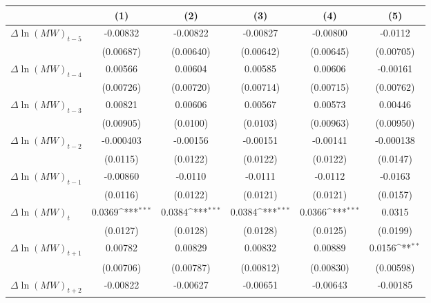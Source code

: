 {
\def\sym#1{\ifmmode^{#1}\else\(^{#1}\)\fi}
\begin{tabular}{l*{5}{c}}
\hline\hline
          &\multicolumn{1}{c}{(1)}         &\multicolumn{1}{c}{(2)}         &\multicolumn{1}{c}{(3)}         &\multicolumn{1}{c}{(4)}         &\multicolumn{1}{c}{(5)}         \\
\hline
$\Delta \ln(MW)_{t-5}$& -0.00832         & -0.00822         & -0.00827         & -0.00800         &  -0.0112         \\
          &(0.00687)         &(0.00640)         &(0.00642)         &(0.00645)         &(0.00705)         \\
[1em]
$\Delta \ln(MW)_{t-4}$&  0.00566         &  0.00604         &  0.00585         &  0.00606         & -0.00161         \\
          &(0.00726)         &(0.00720)         &(0.00714)         &(0.00715)         &(0.00762)         \\
[1em]
$\Delta \ln(MW)_{t-3}$&  0.00821         &  0.00606         &  0.00567         &  0.00573         &  0.00446         \\
          &(0.00905)         & (0.0100)         & (0.0103)         &(0.00963)         &(0.00950)         \\
[1em]
$\Delta \ln(MW)_{t-2}$&-0.000403         & -0.00156         & -0.00151         & -0.00141         &-0.000138         \\
          & (0.0115)         & (0.0122)         & (0.0122)         & (0.0122)         & (0.0147)         \\
[1em]
$\Delta \ln(MW)_{t-1}$& -0.00860         &  -0.0110         &  -0.0111         &  -0.0112         &  -0.0163         \\
          & (0.0116)         & (0.0122)         & (0.0121)         & (0.0121)         & (0.0157)         \\
[1em]
$\Delta \ln(MW)_{t}$&   0.0369\sym{***}&   0.0384\sym{***}&   0.0384\sym{***}&   0.0366\sym{***}&   0.0315         \\
          & (0.0127)         & (0.0128)         & (0.0128)         & (0.0125)         & (0.0199)         \\
[1em]
$\Delta \ln(MW)_{t+1}$&  0.00782         &  0.00829         &  0.00832         &  0.00889         &   0.0156\sym{**} \\
          &(0.00706)         &(0.00787)         &(0.00812)         &(0.00830)         &(0.00598)         \\
[1em]
$\Delta \ln(MW)_{t+2}$& -0.00822         & -0.00627         & -0.00651         & -0.00643         & -0.00185         \\

\end{tabular}}
